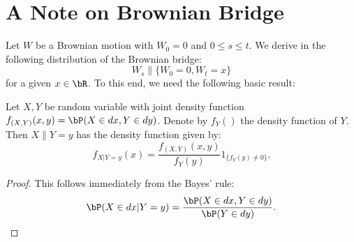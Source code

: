 \section{A Note on Brownian Bridge}
Let $W$ be a Brownian motion with $W_0 = 0$ and $0\le s \le t$. We derive in the following distribution of the Brownian bridge:
\begin{equation}
W_s \| \{W_0 = 0, W_t = x\}
\end{equation}
for a given $x\in \bR$.
To this end, we need the following basic result:
\begin{lem}\label{lem_cond_density}
	Let $X, Y$ be random variable with joint density function $f_{(X,Y)}(x,y) = \bP(X\in dx, Y \in dy)$. Denote by $f_Y()$ the density function of $Y$. Then $X\| Y = y$ has the density function given by:
	\begin{equation}
		f_{X|Y=y}(x) = \frac{f_{(X,Y)}(x,y)}{f_Y(y)} 1_{\{f_Y(y)\neq 0\}}.
	\end{equation}
\end{lem}
\begin{proof}
	This follows immediately from the Bayes' rule:
	\begin{equation*}
		\bP(X\in dx|Y=y) = \frac{\bP(X\in dx, Y\in dy)}{\bP(Y\in dy)}.
	\end{equation*}
	
\end{proof}

